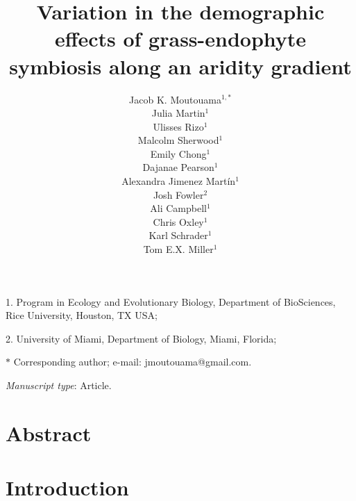 \documentclass[11pt]{article}
\title{Variation in the demographic effects of grass-endophyte symbiosis along an aridity gradient }
\author{Jacob K. Moutouama$^{1,\ast}$ \\ 
Julia Martin$^{1}$ \\ 
Ulisses Rizo$^{1}$\\
Malcolm Sherwood$^{1}$\\
Emily Chong$^{1}$\\
Dajanae Pearson$^{1}$\\
Alexandra Jimenez Martín$^{1}$\\
Josh Fowler$^{2}$\\
Ali Campbell$^{1}$\\
Chris Oxley$^{1}$\\
Karl Schrader$^{1}$\\
Tom E.X. Miller$^{1}$\\}
\date{}
\begin{document}
\maketitle

\noindent{} 1. Program in Ecology and Evolutionary Biology, Department of BioSciences, Rice University, Houston, TX USA;

\noindent{} 2. University of Miami, Department of Biology, Miami, Florida;

\noindent{} $\ast$ Corresponding author; e-mail: jmoutouama@gmail.com.


\bigskip


\bigskip


\bigskip

\textit{Manuscript type}: Article. %

\bigskip


\linenumbers{}
\modulolinenumbers[1]

\newpage{}

\section*{Abstract}

\newpage{}

\section*{Introduction}

\end{document}
